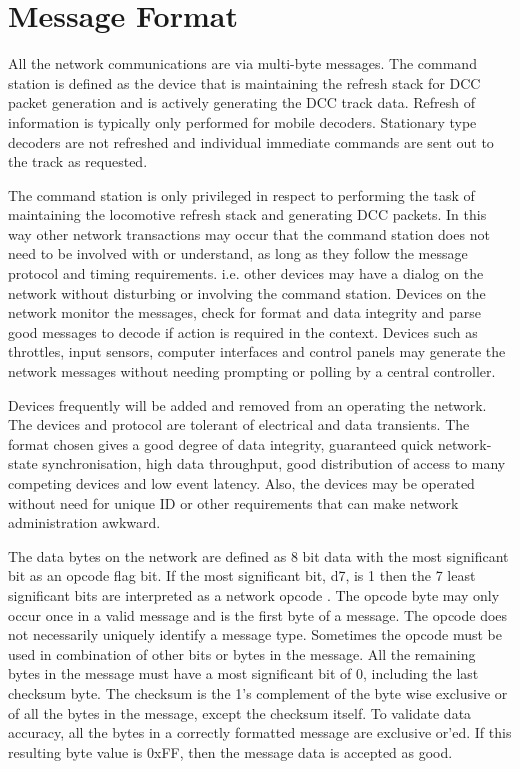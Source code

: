 \section{Message Format}

All the network communications are via multi-byte messages. The command station is defined as the device that is maintaining the refresh stack for DCC packet generation and is actively generating the DCC track data. Refresh of information is typically only performed for mobile decoders. Stationary type decoders are not refreshed and individual immediate commands are sent out to the track as requested.

The command station is only privileged in respect to performing the task of maintaining the locomotive refresh stack and generating DCC packets. In this way other network transactions may occur that the command station does not need to be involved with or understand, as long as they follow the message protocol and timing requirements. i.e. other devices may have a dialog on the network without disturbing or involving the command station. Devices on the network monitor the messages, check for format and data integrity and parse good messages to decode if action is required in the context. Devices such as throttles, input sensors, computer interfaces and control panels may generate the network messages without needing prompting or polling by a central controller.

Devices frequently will be added and removed from an operating the network. The devices and protocol are tolerant of electrical and data transients. The format chosen gives a good degree of data integrity, guaranteed quick network-state synchronisation, high data throughput, good distribution of access to many competing devices and low event latency. Also, the devices may be operated without need for unique ID or other requirements that can make network administration awkward.

The data bytes on the network are defined as 8 bit data with the most significant bit as an opcode flag bit. If the most significant bit, d7, is 1 then the 7 least significant bits are interpreted as a network opcode . The opcode byte may only occur once in a valid message and is the first byte of a message. The opcode does not necessarily uniquely identify a message type. Sometimes the opcode must be used in combination of other bits or bytes in the message. All the remaining bytes in the message must have a most significant bit of 0, including the last checksum byte. The checksum is the 1's complement of the byte wise exclusive or of all the bytes in the message, except the checksum itself. To validate data accuracy, all the bytes in a correctly formatted message are exclusive or'ed. If this resulting byte value is 0xFF, then the message data is accepted as good.

